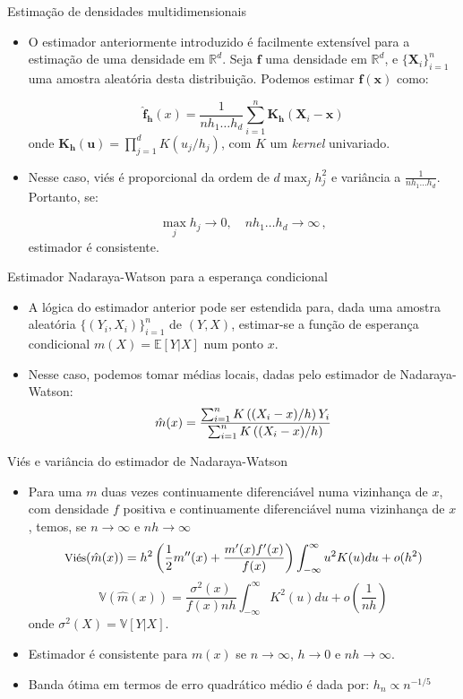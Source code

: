 \documentclass[11pt]{beamer}
\begin{document}
	\begin{frame}{Estimação de densidades multidimensionais}
		\begin{itemize}
			\item O estimador anteriormente introduzido é facilmente extensível para a estimação de uma densidade em $\mathbb{R}^d$. Seja $\boldsymbol{f}$ uma densidade em $\mathbb{R}^d$, e $\{\boldsymbol{X}_i\}_{i=1}^n$ uma amostra aleatória desta distribuição. Podemos estimar $\boldsymbol{f}(\boldsymbol{x})$ como:
			
			$$\hat{\boldsymbol{f}}_{\boldsymbol{h}}(x) = \frac{1}{nh_1\ldots h_d}\sum_{i=1}^n \boldsymbol{K}_{\boldsymbol{h}}\left(\boldsymbol{X}_i - \boldsymbol{x}\right)$$
			onde $\boldsymbol{K}_{\boldsymbol{h}}(\boldsymbol{u}) =\prod_{j=1}^d K(u_j/h_j)$, com $K$ um \textit{kernel} univariado.
			\item Nesse caso, viés é proporcional da ordem de $d \max_j h^2_j$ e variância a $\frac{1}{nh_1\ldots h_d}$. Portanto, se:
			
			$$\max_j h_j \to 0,\quad  nh_1\ldots h_d \to \infty \, ,$$
			estimador é consistente.
		\end{itemize}
	\end{frame}
	
	\begin{frame}{Estimador Nadaraya-Watson para a esperança condicional}
		\begin{itemize}
			\item A lógica do estimador anterior pode ser estendida para, dada uma amostra aleatória $\{(Y_i,X_i)\}_{i=1}^n$ de  $(Y,X)$, estimar-se a função de esperança condicional $m(X) = \mathbb{E}[Y|X]$ num ponto ${x}$.
			\item Nesse caso, podemos tomar médias locais, dadas pelo estimador de {\color{blue}Nadaraya-Watson}:
			$$\small \hat{m}(x) = \frac{\sum_{i=1}^n K\left( (X_i-x)/h\right) Y_i}{\sum_{i=1}^n K\left((X_i-x)/h \right)}$$
			
		\end{itemize}
	\end{frame}
	\begin{frame}{Viés e variância do estimador de Nadaraya-Watson}
		\begin{itemize}
			\item 	Para uma $m$ duas vezes continuamente diferenciável numa vizinhança de ${x}$, com densidade $f$ positiva e continuamente diferenciável numa vizinhança de ${x}$, temos, se $n\to \infty$ e $nh\to \infty$
			$$\small \text{Vi\'{e}s}(\hat{m}(x)) = h^{2}\left(\frac{1}{2} m^{\prime \prime}(x)+\frac{m^{\prime}(x) f^{\prime}(x)}{f(x)}\right) \int_{-\infty}^{\infty} u^{2} K(u) d u  + o(h^2)$$
			$$\mathbb{V}(\hat{m}(x)) = \frac{\sigma^{2}(x)}{f(x) n h} \int_{-\infty}^{\infty} K^{2}(u) d u + o\left(\frac{1}{nh}\right)$$
			onde $\sigma^2(X) = \mathbb{V}[Y|X]$.
			\item Estimador é consistente para $m(x)$ se $n\to \infty$, $h\to 0$ e $nh\to \infty$.
			\item Banda ótima em termos de erro quadrático médio é dada por:
			$h_n \propto n^{-1/5}$
		\end{itemize}

	\end{frame}
\end{document}
